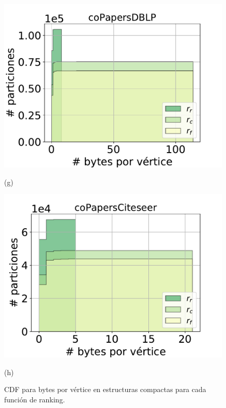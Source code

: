 \begin{figure}
    	\begin{minipage}{1\textwidth}
    		\centering
    		\begin{minipage}{0.45\textwidth}
    			\centering
    			\includegraphics[width=1\linewidth]{img/cdf/coPapersDBLP.pdf}
    			
    			(g)
    		\end{minipage}
    		\begin{minipage}{0.45\textwidth}
    			\centering
    			\includegraphics[width=1\linewidth]{img/cdf/coPapersCiteseer.pdf}
    			
    			(h)
    		\end{minipage}  
    	\end{minipage}
    	
%    		
    \caption{CDF para bytes por vértice en estructuras compactas para cada función de ranking.}
    \label{fig:cdfBPN}
\end{figure}
